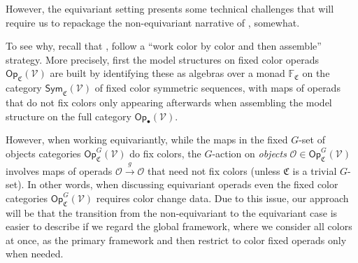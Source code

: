 \documentclass[a4paper,10pt
,draft
]{article}%
\numberwithin{equation}{section}
\numberwithin{figure}{section}
\theoremstyle{definition} %
\newcommand{\V}{\ensuremath{\mathcal V}}
\renewcommand{\O}{\ensuremath{\mathcal O}}
\newcommand{\1}{\ensuremath{\mathbbm 1}}%
\begin{document}
However, the equivariant setting presents some technical challenges that will require us to repackage the non-equivariant narrative of
\cite{CM13b},\cite{Cav} somewhat.

To see why, recall that \cite{CM13b},\cite{Cav}
follow a ``work color by color and then assemble'' strategy.
More precisely, first the model structures on fixed color operads 
$\mathsf{Op}_{\mathfrak{C}}(\V)$
are built by identifying these as algebras over a monad
$\mathbb{F}_{\mathfrak{C}}$
on the category $\mathsf{Sym}_{\mathfrak{C}}(\V)$
of fixed color symmetric sequences,
with maps of operads that do not fix colors
only appearing afterwards when assembling the model structure on the full category $\mathsf{Op}_{\bullet}(\V)$.

However, when working equivariantly, 
while the maps in the fixed $G$-set of objects categories 
$\mathsf{Op}^G_{\mathfrak{C}}(\V)$ do fix colors, 
the $G$-action on \emph{objects}
$\O \in \mathsf{Op}^G_{\mathfrak{C}}(\V)$
involves maps of operads $\O \xrightarrow{g} \O$
that need not fix colors (unless $\mathfrak{C}$ is a trivial $G$-set).
In other words, when discussing equivariant operads even the fixed color categories 
$\mathsf{Op}^G_{\mathfrak{C}}(\V)$
requires color change data.
Due to this issue, 
our approach will be that the transition from the non-equivariant to the equivariant case is easier to describe 
if we regard the global framework,
where we consider all colors at once, as the primary framework
and then restrict to color fixed operads only when needed.
\end{document}
